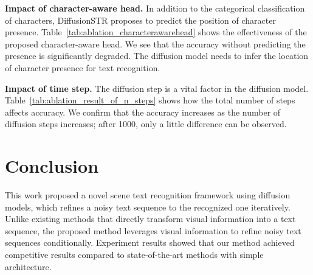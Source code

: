 \documentclass{article}
\begin{document}
\noindent
\textbf{Impact of character-aware head.}
In addition to the categorical classification of characters, DiffusionSTR proposes to predict the position of character presence.
Table~\ref{tab:ablation_characterawarehead} shows the effectiveness of the proposed character-aware head.
We see that the accuracy without predicting the presence is significantly degraded.
The diffusion model needs to infer the location of character presence for text recognition.


\begin{table}[tb]
    \centering
    \caption{
    \textbf{Impact of the time step $T$. }
    }
    \vspace*{-0.75\baselineskip}
    \label{tab:ablation_result_of_n_steps}
    \vspace*{-1.00\baselineskip}
\end{table}


\noindent
\textbf{Impact of time step.}
The diffusion step is a vital factor in the diffusion model.
Table~\ref{tab:ablation_result_of_n_steps} shows how the total number of steps affects accuracy.
We confirm that the accuracy increases as the number of diffusion steps increases; after 1000, only a little difference can be observed.
 
\section{Conclusion}\label{sec:conclusion}
This work proposed a novel scene text recognition framework using diffusion models, which refines a noisy text sequence to the recognized one iteratively.
Unlike existing methods that directly transform visual information into a text sequence, the proposed method leverages visual information to refine noisy text sequences conditionally.
Experiment results showed that our method achieved competitive results compared to state-of-the-art methods with simple architecture. 
\clearpage

{\small


}
\end{document}
